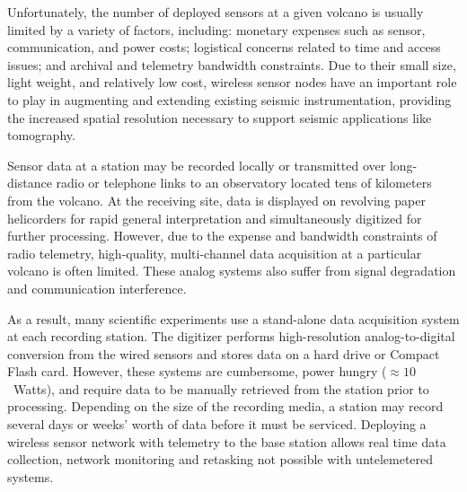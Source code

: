 Unfortunately, the number of deployed sensors at a given volcano is usually
limited by a variety of factors, including: monetary expenses such as sensor,
communication, and power costs; logistical concerns related to time and access
issues; and archival and telemetry bandwidth constraints. Due to their small
size, light weight, and relatively low cost, wireless sensor nodes have an
important role to play in augmenting and extending existing seismic
instrumentation, providing the increased spatial resolution necessary to
support seismic applications like tomography.

Sensor data at a station may be recorded locally or transmitted over
long-distance radio or telephone links to an observatory located tens of
kilometers from the volcano.  At the receiving site, data is displayed on
revolving paper helicorders for rapid general interpretation and
simultaneously digitized for further processing.  However, due to the expense
and bandwidth constraints of radio telemetry, high-quality, multi-channel
data acquisition at a particular volcano is often limited. These analog
systems also suffer from signal degradation and communication interference.

As a result, many scientific experiments use a stand-alone data acquisition
system at each recording station.  The digitizer performs high-resolution
analog-to-digital conversion from the wired sensors and stores data on a hard
drive or Compact Flash card. However, these systems are cumbersome, power
hungry ($\approx 10$~Watts), and require data to be manually retrieved from
the station prior to processing. Depending on the size of the recording
media, a station may record several days or weeks' worth of data before it
must be serviced. Deploying a wireless sensor network with telemetry to the
base station allows real time data collection, network monitoring and
retasking not possible with untelemetered systems.

